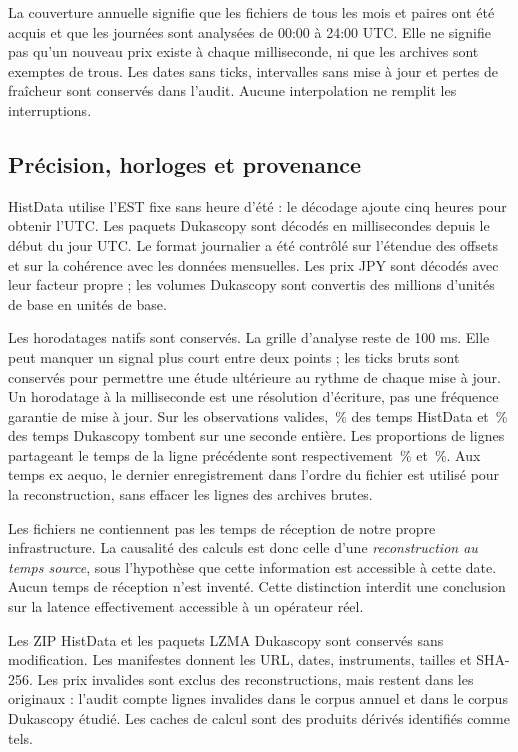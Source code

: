 La couverture annuelle signifie que les fichiers de tous les mois et paires ont été acquis et que les journées sont analysées de 00:00 à 24:00 UTC. Elle ne signifie pas qu'un nouveau prix existe à chaque milliseconde, ni que les archives sont exemptes de trous. Les dates sans ticks, intervalles sans mise à jour et pertes de fraîcheur sont conservés dans l'audit. Aucune interpolation ne remplit les interruptions.

\subsection{Précision, horloges et provenance}

HistData utilise l'EST fixe sans heure d'été : le décodage ajoute cinq heures pour obtenir l'UTC. Les paquets Dukascopy sont décodés en millisecondes depuis le début du jour UTC. Le format journalier a été contrôlé sur l'étendue des offsets et sur la cohérence avec les données mensuelles. Les prix JPY sont décodés avec leur facteur propre ; les volumes Dukascopy sont convertis des millions d'unités de base en unités de base.

Les horodatages natifs sont conservés. La grille d'analyse reste de 100 ms. Elle peut manquer un signal plus court entre deux points ; les ticks bruts sont conservés pour permettre une étude ultérieure au rythme de chaque mise à jour. Un horodatage à la milliseconde est une résolution d'écriture, pas une fréquence garantie de mise à jour. Sur les observations valides, \EmpHistWholeSeconds{}\,\% des temps HistData et \EmpDukaWholeSeconds{}\,\% des temps Dukascopy tombent sur une seconde entière. Les proportions de lignes partageant le temps de la ligne précédente sont respectivement \EmpHistDuplicates{}\,\% et \EmpDukaDuplicates{}\,\%. Aux temps ex aequo, le dernier enregistrement dans l'ordre du fichier est utilisé pour la reconstruction, sans effacer les lignes des archives brutes.

Les fichiers ne contiennent pas les temps de réception de notre propre infrastructure. La causalité des calculs est donc celle d'une \emph{reconstruction au temps source}, sous l'hypothèse que cette information est accessible à cette date. Aucun temps de réception n'est inventé. Cette distinction interdit une conclusion sur la latence effectivement accessible à un opérateur réel.

Les ZIP HistData et les paquets LZMA Dukascopy sont conservés sans modification. Les manifestes donnent les URL, dates, instruments, tailles et SHA-256. Les prix invalides sont exclus des reconstructions, mais restent dans les originaux : l'audit compte \EmpHistInvalid{} lignes invalides dans le corpus annuel et \EmpDukaInvalid{} dans le corpus Dukascopy étudié. Les caches de calcul sont des produits dérivés identifiés comme tels.

